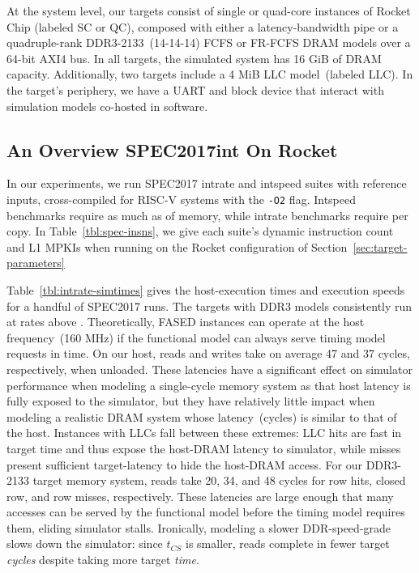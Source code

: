 At the system level, our targets consist of single or quad-core instances
of Rocket Chip (labeled SC or QC), composed with either a latency-bandwidth pipe
or a quadruple-rank DDR3-2133~(14-14-14) FCFS or FR-FCFS
DRAM models over a 64-bit AXI4 bus. In all targets, the simulated system has
16 GiB of DRAM capacity. Additionally, two targets include a 4 MiB
LLC model~(labeled LLC). In the target's periphery, we have a UART and block
device that interact with simulation models co-hosted in software.

\subsection{An Overview SPEC2017int On Rocket}
In our experiments, we run SPEC2017 intrate and intspeed suites with reference
inputs, cross-compiled for RISC-V systems with the \texttt{-O2} flag.
Intspeed benchmarks require as much as  of memory, while intrate
benchmarks require  per copy.  In Table~\ref{tbl:spec-insns}, we give each suite's dynamic instruction
count and L1 MPKIs when running on the Rocket configuration of
Section~\ref{sec:target-parameters}



Table~\ref{tbl:intrate-simtimes} gives the
host-execution times and execution speeds for a handful of SPEC2017 runs. The
targets with DDR3 models consistently run at rates above . Theoretically,
FASED instances can operate at the host frequency~(160 MHz) if the functional model can always serve timing model requests in time.
On our host, reads and writes take on average 47
and 37 cycles, respectively, when unloaded.  These latencies have
a significant effect on simulator performance when modeling a single-cycle memory
system as that host latency is fully exposed to the simulator, but
they have relatively little impact
when modeling a realistic DRAM system
whose latency~(cycles) is similar to that of the host.
Instances with LLCs fall between these extremes: LLC hits are fast in
target time and thus expose the host-DRAM latency to simulator, while
misses present sufficient target-latency to hide the host-DRAM access.
For our DDR3-2133 target memory system, reads take 20, 34, and 48 cycles for
row hits, closed row, and row misses, respectively. These latencies are large enough that many accesses can be
served by the functional model before the timing model requires them, eliding simulator stalls.
Ironically, modeling a slower DDR-speed-grade slows down the simulator: since $t_{CS}$ is smaller, reads complete in fewer target
\emph{cycles} despite taking more target \emph{time}.

